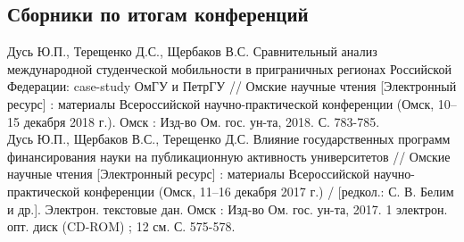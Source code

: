 \documentclass[10pt]{article}
\newcommand{\years}[1]{\marginnote{\scriptsize #1}}
\begin{document}
\subsection*{Сборники по итогам конференций}
\noindent
\years{2018}Дусь Ю.П., Терещенко Д.С., Щербаков В.С. Сравнительный анализ международной студенческой мобильности в приграничных регионах Российской Федерации: case-study ОмГУ и ПетрГУ // Омские научные чтения [Электронный ресурс] : материалы Всероссийской научно-практической конференции (Омск, 10–15 декабря 2018 г.). Омск : Изд-во Ом. гос. ун-та, 2018. С. 783-785.\\
\years{2017}Дусь Ю.П., Щербаков В.С., Терещенко Д.С. Влияние государственных программ финансирования науки на публикационную активность университетов // Омские научные чтения [Электронный ресурс] : материалы Всероссийской научно-практической конференции (Омск, 11–16 декабря 2017 г.) / [редкол.: С. В. Белим и др.]. Электрон. текстовые дан. Омск : Изд-во Ом. гос. ун-та, 2017. 1 электрон. опт. диск (CD-ROM) ; 12 см. С. 575-578.\\
\end{document}
